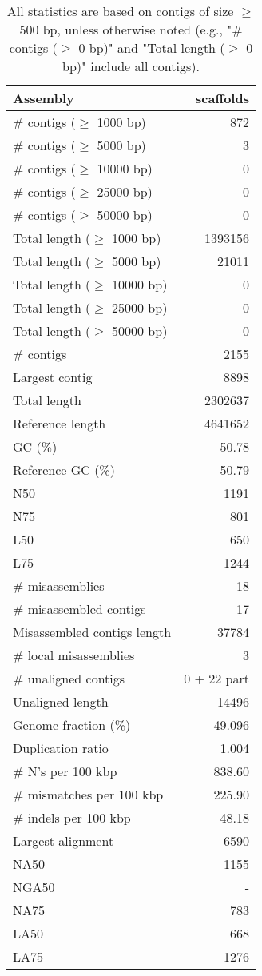 \documentclass[12pt,a4paper]{article}
\begin{document}
\begin{table}[ht]
\begin{center}
\caption{All statistics are based on contigs of size $\geq$ 500 bp, unless otherwise noted (e.g., "\# contigs ($\geq$ 0 bp)" and "Total length ($\geq$ 0 bp)" include all contigs).}
\begin{tabular}{|l*{1}{|r}|}
\hline
Assembly & scaffolds \\ \hline
\# contigs ($\geq$ 1000 bp) & 872 \\ \hline
\# contigs ($\geq$ 5000 bp) & 3 \\ \hline
\# contigs ($\geq$ 10000 bp) & 0 \\ \hline
\# contigs ($\geq$ 25000 bp) & 0 \\ \hline
\# contigs ($\geq$ 50000 bp) & 0 \\ \hline
Total length ($\geq$ 1000 bp) & 1393156 \\ \hline
Total length ($\geq$ 5000 bp) & 21011 \\ \hline
Total length ($\geq$ 10000 bp) & 0 \\ \hline
Total length ($\geq$ 25000 bp) & 0 \\ \hline
Total length ($\geq$ 50000 bp) & 0 \\ \hline
\# contigs & 2155 \\ \hline
Largest contig & 8898 \\ \hline
Total length & 2302637 \\ \hline
Reference length & 4641652 \\ \hline
GC (\%) & 50.78 \\ \hline
Reference GC (\%) & 50.79 \\ \hline
N50 & 1191 \\ \hline
N75 & 801 \\ \hline
L50 & 650 \\ \hline
L75 & 1244 \\ \hline
\# misassemblies & 18 \\ \hline
\# misassembled contigs & 17 \\ \hline
Misassembled contigs length & 37784 \\ \hline
\# local misassemblies & 3 \\ \hline
\# unaligned contigs & 0 + 22 part \\ \hline
Unaligned length & 14496 \\ \hline
Genome fraction (\%) & 49.096 \\ \hline
Duplication ratio & 1.004 \\ \hline
\# N's per 100 kbp & 838.60 \\ \hline
\# mismatches per 100 kbp & 225.90 \\ \hline
\# indels per 100 kbp & 48.18 \\ \hline
Largest alignment & 6590 \\ \hline
NA50 & 1155 \\ \hline
NGA50 & - \\ \hline
NA75 & 783 \\ \hline
LA50 & 668 \\ \hline
LA75 & 1276 \\ \hline
\end{tabular}
\end{center}
\end{table}
\end{document}
